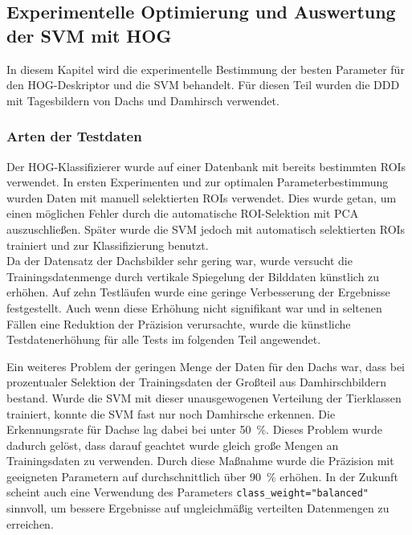 \subsection{Experimentelle Optimierung und Auswertung der SVM mit HOG} \label{sec:HOG_parameter_and_results}
In diesem Kapitel wird die experimentelle Bestimmung der besten Parameter für den HOG-Deskriptor und die SVM behandelt. Für diesen Teil wurden die DDD mit Tagesbildern von Dachs und Damhirsch verwendet.


\subsubsection{Arten der Testdaten} \label{sssec:test_data_HOG}
Der HOG-Klassifizierer wurde auf einer Datenbank mit bereits bestimmten ROIs verwendet. In ersten Experimenten und zur optimalen Parameterbestimmung wurden Daten mit manuell selektierten ROIs verwendet. Dies wurde getan, um einen möglichen Fehler durch die automatische ROI-Selektion mit PCA auszuschließen. Später wurde die SVM jedoch mit automatisch selektierten ROIs trainiert und zur Klassifizierung benutzt.\\ 
Da der Datensatz der Dachsbilder sehr gering war, wurde versucht die Trainingsdatenmenge durch vertikale Spiegelung der Bilddaten künstlich zu erhöhen. Auf zehn Testläufen wurde eine geringe Verbesserung der Ergebnisse festgestellt. Auch wenn diese Erhöhung nicht signifikant war und in seltenen Fällen eine Reduktion der Präzision verursachte, wurde die künstliche Testdatenerhöhung für alle Tests im folgenden Teil angewendet. 

Ein weiteres Problem der geringen Menge der Daten für den Dachs war, dass bei prozentualer Selektion der Trainingsdaten der Großteil aus Damhirschbildern bestand. Wurde die SVM mit dieser unausgewogenen Verteilung der Tierklassen trainiert, konnte die SVM fast nur noch Damhirsche erkennen. Die Erkennungsrate für Dachse lag dabei bei unter 50~\%. Dieses Problem wurde dadurch gelöst, dass darauf geachtet wurde gleich große Mengen an Trainingsdaten zu verwenden. Durch diese Maßnahme wurde die Präzision mit geeigneten Parametern auf durchschnittlich über 90~\% erhöhen. In der Zukunft scheint auch eine Verwendung des Parameters \texttt{class\_weight="balanced"} sinnvoll, um bessere Ergebnisse auf ungleichmäßig verteilten Datenmengen zu erreichen.

